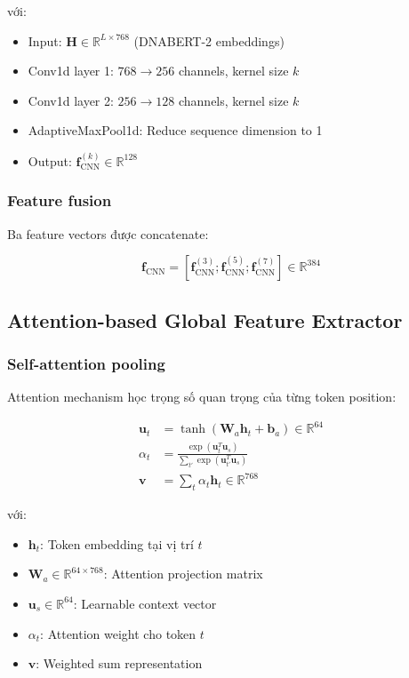 với:
\begin{itemize}
    \item Input: $\mathbf{H} \in \mathbb{R}^{L \times 768}$ (DNABERT-2 embeddings)
    \item Conv1d layer 1: $768 \rightarrow 256$ channels, kernel size $k$
    \item Conv1d layer 2: $256 \rightarrow 128$ channels, kernel size $k$
    \item AdaptiveMaxPool1d: Reduce sequence dimension to 1
    \item Output: $\mathbf{f}_{\text{CNN}}^{(k)} \in \mathbb{R}^{128}$
\end{itemize}

\subsubsection{Feature fusion}

Ba feature vectors được concatenate:

\begin{equation}
\mathbf{f}_{\text{CNN}} = [\mathbf{f}_{\text{CNN}}^{(3)}; \mathbf{f}_{\text{CNN}}^{(5)}; \mathbf{f}_{\text{CNN}}^{(7)}] \in \mathbb{R}^{384}
\end{equation}

\subsection{Attention-based Global Feature Extractor}

\subsubsection{Self-attention pooling}

Attention mechanism học trọng số quan trọng của từng token position:

\begin{align}
\mathbf{u}_t &= \tanh(\mathbf{W}_a \mathbf{h}_t + \mathbf{b}_a) \in \mathbb{R}^{64} \\
\alpha_t &= \frac{\exp(\mathbf{u}_t^T \mathbf{u}_s)}{\sum_{t'} \exp(\mathbf{u}_{t'}^T \mathbf{u}_s)} \\
\mathbf{v} &= \sum_t \alpha_t \mathbf{h}_t \in \mathbb{R}^{768}
\end{align}

với:
\begin{itemize}
    \item $\mathbf{h}_t$: Token embedding tại vị trí $t$
    \item $\mathbf{W}_a \in \mathbb{R}^{64 \times 768}$: Attention projection matrix
    \item $\mathbf{u}_s \in \mathbb{R}^{64}$: Learnable context vector
    \item $\alpha_t$: Attention weight cho token $t$
    \item $\mathbf{v}$: Weighted sum representation
\end{itemize}


